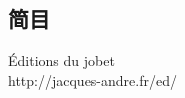 \chapter*{\lecon}
\section*{简目}
\setcounter{tocdepth}{0}
\renewcommand{\contentsname}{}

\vspace{-2.5cm}
\tableofcontents

\vfill
\begin{center}
    Éditions du jobet\\
    http://jacques-andre.fr/ed/
\end{center}
\vfill